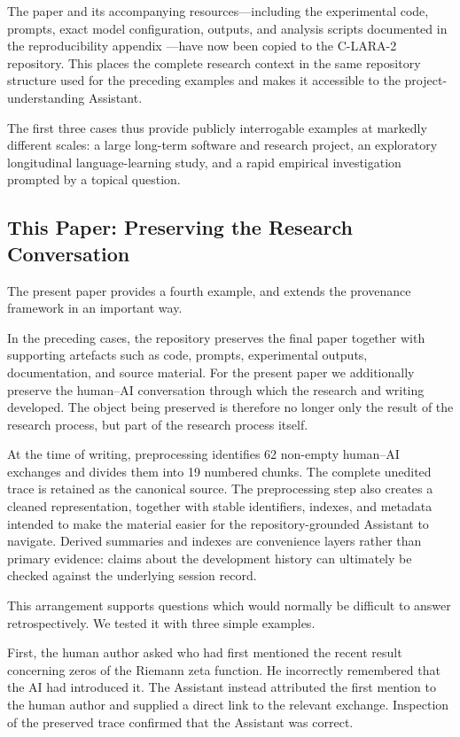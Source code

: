 \documentclass[12pt]{article}
\begin{document}
The paper and its accompanying resources---including the experimental code, prompts, exact model configuration, outputs, and analysis scripts documented in the reproducibility appendix \citep[Appendix~A]{raynerChatGPT2025grok}---have now been copied to the C-LARA-2 repository. This places the complete research context in the same repository structure used for the preceding examples and makes it accessible to the project-understanding Assistant.

The first three cases thus provide publicly interrogable examples at markedly different scales: a large long-term software and research project, an exploratory longitudinal language-learning study, and a rapid empirical investigation prompted by a topical question.


\subsection{This Paper: Preserving the Research Conversation}
\label{sec:vibe-research-session-provenance}

The present paper provides a fourth example, and extends the provenance framework in an important way.

In the preceding cases, the repository preserves the final paper together with supporting artefacts such as code, prompts, experimental outputs, documentation, and source material. For the present paper we additionally preserve the human--AI conversation through which the research and writing developed. The object being preserved is therefore no longer only the result of the research process, but part of the research process itself.

At the time of writing, preprocessing identifies 62 non-empty human--AI exchanges and divides them into 19 numbered chunks. The complete unedited trace is retained as the canonical source. The preprocessing step also creates a cleaned representation, together with stable identifiers, indexes, and metadata intended to make the material easier for the repository-grounded Assistant to navigate. Derived summaries and indexes are convenience layers rather than primary evidence: claims about the development history can ultimately be checked against the underlying session record.

This arrangement supports questions which would normally be difficult to answer retrospectively. We tested it with three simple examples.

First, the human author asked who had first mentioned the recent result concerning zeros of the Riemann zeta function. He incorrectly remembered that the AI had introduced it. The Assistant instead attributed the first mention to the human author and supplied a direct link to the relevant exchange. Inspection of the preserved trace confirmed that the Assistant was correct.
\end{document}
